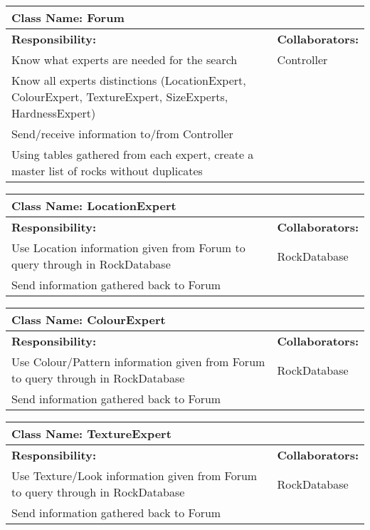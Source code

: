 \documentclass[]{article}
\begin{document}
\begin{table}[ht]
	\centering
	\begin{tabular}{|p{8cm}|p{8cm}|}
		\hline 
		\multicolumn{2}{|l|}{\textbf{Class Name: Forum}} \\
		\hline
		\textbf{Responsibility:} & \textbf{Collaborators:} \\
		\hline
		Know what experts are needed for the search & Controller\\
		\hline
		Know all experts distinctions (LocationExpert, ColourExpert, TextureExpert, SizeExperts, HardnessExpert) & \\
		\hline
		Send/receive information to/from Controller & \\
		\hline
		Using tables gathered from each expert, create a master list of rocks without duplicates & \\
		\hline
	\end{tabular}
\end{table}

\begin{table}[ht]
	\centering
	\begin{tabular}{|p{8cm}|p{8cm}|}
		\hline 
		\multicolumn{2}{|l|}{\textbf{Class Name: LocationExpert}} \\
		\hline
		\textbf{Responsibility:} & \textbf{Collaborators:} \\
		\hline
		Use Location information given from Forum to query through in RockDatabase & RockDatabase\\
		\hline
		Send information gathered back to Forum & \\
		\hline
	\end{tabular}
\end{table}

\begin{table}[ht]
	\centering
	\begin{tabular}{|p{8cm}|p{8cm}|}
		\hline 
		\multicolumn{2}{|l|}{\textbf{Class Name: ColourExpert}} \\
		\hline
		\textbf{Responsibility:} & \textbf{Collaborators:} \\
		\hline
		Use Colour/Pattern information given from Forum to query through in RockDatabase & RockDatabase\\
		\hline
		Send information gathered back to Forum & \\
		\hline
	\end{tabular}
\end{table}

\begin{table}[ht]
	\centering
	\begin{tabular}{|p{8cm}|p{8cm}|}
		\hline 
		\multicolumn{2}{|l|}{\textbf{Class Name: TextureExpert}} \\
		\hline
		\textbf{Responsibility:} & \textbf{Collaborators:} \\
		\hline
		Use Texture/Look information given from Forum to query through in RockDatabase & RockDatabase\\
		\hline
		Send information gathered back to Forum & \\
		\hline
	\end{tabular}
\end{table}
\end{document}
